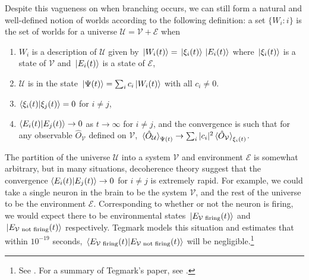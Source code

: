     Despite this vagueness on when branching occurs, we can still form a natural and well-defined notion of worlds according to the following definition: \label{rigorousworld} a set $\{W_i: i\}$ is the set of worlds for a universe $\mathcal{U}=\mathcal{V}+\mathcal{E}$ when 
     \begin{enumerate}[noitemsep, nosep, topsep=0pt]
     \item $W_i$ is a description of $\mathcal{U}$ given by $\ket*{W_i(t)}=\ket*{\xi_i(t)}\ket*{E_i(t)}$ where $\ket*{\xi_i(t)}$ is a state of $\mathcal{V}$ and $\ket*{E_i(t)}$ is a state of $\mathcal{E}$,
     \item $\mathcal{U}$ is in the state $\ket*{\Psi(t)}=\sum_i c_i \ket*{W_i(t)}$ with all $c_i\neq 0$.
     \item $\ip{\xi_i(t)}{\xi_j(t)}=0$ for $i\neq j$,
     \item $\ip{E_i(t)}{E_j(t)}\rightarrow 0$ as $t\rightarrow\infty$ for $i\neq j$, and the convergence is such that for any observable $\hat{O}_\mathcal{V}$ defined on $\mathcal{V}$, $\ev*{\hat{O}_\mathcal{U}}_{\Psi(t)}\rightarrow\sum_i |c_i|^2 \ev*{\hat{O}_\mathcal{V}}_{\xi_i(t)}$. 
     \end{enumerate}
     The partition of the universe $\mathcal{U}$ into a system $\mathcal{V}$ and environment $\mathcal{E}$ is somewhat arbitrary, but in many situations, decoherence theory suggest that the convergence $\ip{E_i(t)}{E_j(t)}\rightarrow 0$ for $i\neq j$ is extremely rapid. For example, we could take a single neuron in the brain to be the system $\mathcal{V}$, and the rest of the universe to be the environment $\mathcal{E}$. Corresponding to whether or not the neuron is firing, we would expect there to be  environmental states $\ket*{E_{\mathcal{V}\text{ firing}}(t)}$ and $\ket*{E_{\mathcal{V}\text{ not firing}}(t)}$  respectively. Tegmark models this situation and estimates that within $10^{-19}$ seconds, $\ip*{E_{\mathcal{V}\text{ firing}}(t)}{E_{\mathcal{V}\text{ not firing}}(t)}$ will be negligible.\footnote{See \cite{TegmarkM2000Ioqd}. For a summary of Tegmark's paper, see \cite[368--371]{Schlosshauer}.} 

